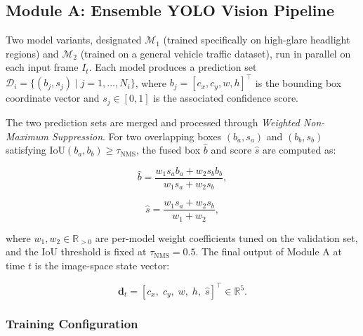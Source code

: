 \documentclass{jstarticle}
\theoremstyle{remark}
\begin{document}
\subsection{Module A: Ensemble YOLO Vision Pipeline}
\label{subsec:yolo}

Two model variants, designated $\mathcal{M}_1$ (trained specifically
on high-glare headlight regions) and $\mathcal{M}_2$ (trained on a
general vehicle traffic dataset), run in parallel on each input
frame $I_t$. Each model produces a prediction set
$\mathcal{D}_i = \{(b_j, s_j) \mid j=1,\ldots,N_i\}$, where
$b_j = [c_x, c_y, w, h]^{\top}$ is the bounding box coordinate vector
and $s_j \in [0,1]$ is the associated confidence score.

The two prediction sets are merged and processed through
\emph{Weighted Non-Maximum Suppression}. For two overlapping boxes
$(b_a, s_a)$ and $(b_b, s_b)$ satisfying
$\mathrm{IoU}(b_a, b_b) \geq \tau_{\mathrm{NMS}}$, the fused box
$\hat{b}$ and score $\hat{s}$ are computed as:

\begin{equation}
\hat{b} = \frac{w_1 s_a b_a + w_2 s_b b_b}{w_1 s_a + w_2 s_b},
\label{eq:nms_box}
\end{equation}

\begin{equation}
\hat{s} = \frac{w_1 s_a + w_2 s_b}{w_1 + w_2},
\label{eq:nms_score}
\end{equation}

\noindent where $w_1, w_2 \in \mathbb{R}_{>0}$ are per-model weight
coefficients tuned on the validation set, and the IoU threshold is
fixed at $\tau_{\mathrm{NMS}} = 0.5$. The final output of Module A at
time $t$ is the image-space state vector:

\begin{equation}
\mathbf{d}_t = [c_x,\; c_y,\; w,\; h,\; \hat{s}]^{\top} \in \mathbb{R}^5.
\label{eq:det_vec}
\end{equation}

\subsubsection{Training Configuration}
\label{subsubsec:training}
\end{document}
